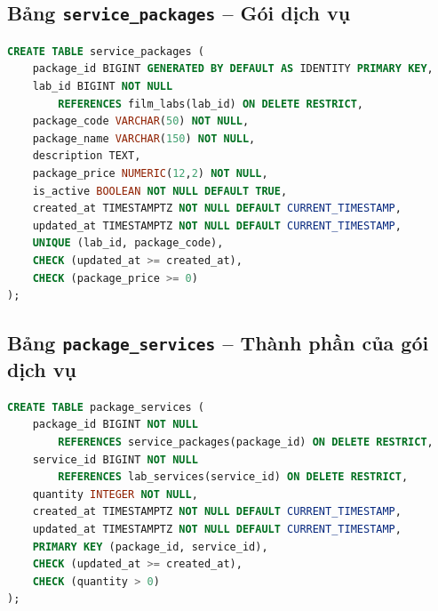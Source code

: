 \subsection{Bảng \texttt{service\_packages} -- Gói dịch vụ}
\label{physical-service_packages}
\begin{lstlisting}[language=SQL,breaklines=true,basicstyle=\ttfamily\scriptsize]
CREATE TABLE service_packages (
    package_id BIGINT GENERATED BY DEFAULT AS IDENTITY PRIMARY KEY,
    lab_id BIGINT NOT NULL
        REFERENCES film_labs(lab_id) ON DELETE RESTRICT,
    package_code VARCHAR(50) NOT NULL,
    package_name VARCHAR(150) NOT NULL,
    description TEXT,
    package_price NUMERIC(12,2) NOT NULL,
    is_active BOOLEAN NOT NULL DEFAULT TRUE,
    created_at TIMESTAMPTZ NOT NULL DEFAULT CURRENT_TIMESTAMP,
    updated_at TIMESTAMPTZ NOT NULL DEFAULT CURRENT_TIMESTAMP,
    UNIQUE (lab_id, package_code),
    CHECK (updated_at >= created_at),
    CHECK (package_price >= 0)
);
\end{lstlisting}
\subsection{Bảng \texttt{package\_services} -- Thành phần của gói dịch vụ}
\label{physical-package_services}
\begin{lstlisting}[language=SQL,breaklines=true,basicstyle=\ttfamily\scriptsize]
CREATE TABLE package_services (
    package_id BIGINT NOT NULL
        REFERENCES service_packages(package_id) ON DELETE RESTRICT,
    service_id BIGINT NOT NULL
        REFERENCES lab_services(service_id) ON DELETE RESTRICT,
    quantity INTEGER NOT NULL,
    created_at TIMESTAMPTZ NOT NULL DEFAULT CURRENT_TIMESTAMP,
    updated_at TIMESTAMPTZ NOT NULL DEFAULT CURRENT_TIMESTAMP,
    PRIMARY KEY (package_id, service_id),
    CHECK (updated_at >= created_at),
    CHECK (quantity > 0)
);
\end{lstlisting}
